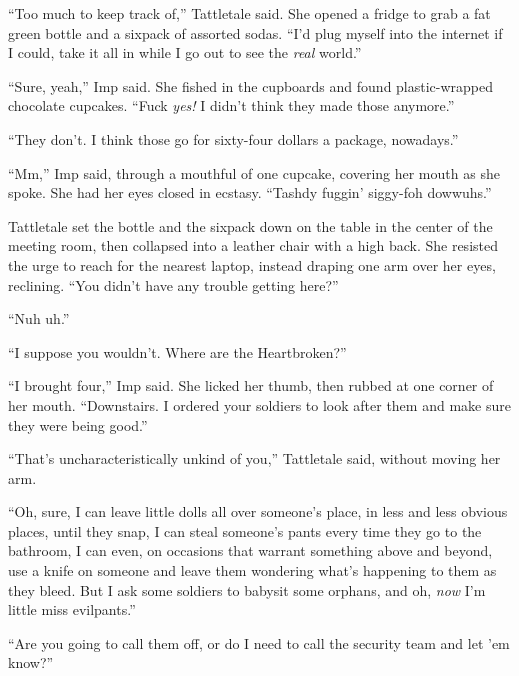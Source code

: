 ``Too much to keep track of,'' Tattletale said.  She opened a fridge to grab a fat green bottle and a sixpack of assorted sodas.  ``I'd plug myself into the internet if I could, take it all in while I go out to see the \emph{real} world.''



``Sure, yeah,'' Imp said.  She fished in the cupboards and found plastic-wrapped chocolate cupcakes.  ``Fuck \emph{yes!  }I didn't think they made those anymore.''



``They don't.  I think those go for sixty-four dollars a package, nowadays.''



``Mm,'' Imp said, through a mouthful of one cupcake, covering her mouth as she spoke.  She had her eyes closed in ecstasy.  ``Tashdy fuggin' siggy-foh dowwuhs.''



Tattletale set the bottle and the sixpack down on the table in the center of the meeting room, then collapsed into a leather chair with a high back.  She resisted the urge to reach for the nearest laptop, instead draping one arm over her eyes, reclining.  ``You didn't have any trouble getting here?''



``Nuh uh.''



``I suppose you wouldn't.  Where are the Heartbroken?''



``I brought four,'' Imp said.  She licked her thumb, then rubbed at one corner of her mouth.  ``Downstairs.  I ordered your soldiers to look after them and make sure they were being good.''



``That's uncharacteristically unkind of you,'' Tattletale said, without moving her arm.



``Oh, sure, I can leave little dolls all over someone's place, in less and less obvious places, until they snap, I can steal someone's pants every time they go to the bathroom, I can even, on occasions that warrant something above and beyond, use a knife on someone and leave them wondering what's happening to them as they bleed.  But I ask some soldiers to babysit some orphans, and oh, \emph{now} I'm little miss evilpants.''



``Are you going to call them off, or do I need to call the security team and let 'em know?''



